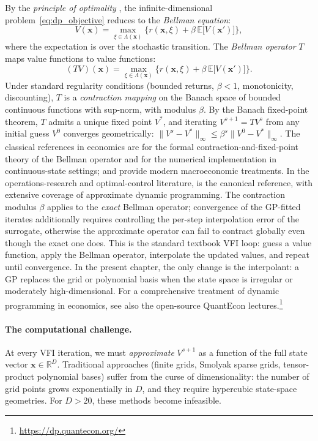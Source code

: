 \documentclass[11pt,a4paper]{report}
\newcommand{\x}{\bm{x}}
\newcommand{\R}{\mathbb{R}}
\begin{document}
By the \emph{principle of optimality} \citep{bellman1957}, the infinite-dimensional problem~\eqref{eq:dp_objective} reduces to the \emph{Bellman equation}:
\begin{equation}
V(\x) = \max_{\xi \in \Lambda(\x)} \bigl\{ r(\x, \xi) + \beta\, \mathbb{E}\bigl[V(\x')\bigr] \bigr\},
\label{eq:bellman}
\end{equation}
where the expectation is over the stochastic transition.  The \emph{Bellman operator} $T$ maps value functions to value functions:
\[
(TV)(\x) = \max_{\xi \in \Lambda(\x)} \bigl\{ r(\x, \xi) + \beta\, \mathbb{E}\bigl[V(\x')\bigr] \bigr\}.
\]
Under standard regularity conditions (bounded returns, $\beta < 1$, monotonicity, discounting), $T$ is a \emph{contraction mapping} on the Banach space of bounded continuous functions with sup-norm, with modulus $\beta$.  By the Banach fixed-point theorem, $T$ admits a unique fixed point $V^*$, and iterating $V^{s+1} = TV^s$ from any initial guess $V^0$ converges geometrically: $\|V^s - V^*\|_\infty \le \beta^s \|V^0 - V^*\|_\infty$.  The classical references in economics are \citet[Chs.~3--4]{stokeylucas1989} for the formal contraction-and-fixed-point theory of the Bellman operator and \citet[][Ch.~12]{judd1998numerical} for the numerical implementation in continuous-state settings; \citet[Chs.~3--4]{ljungqvist2018recursive} and \citet{sargentstachurski2026dp} provide modern macroeconomic treatments.  In the operations-research and optimal-control literature, \citet{Bertsekas:2000:DPO:517430} is the canonical reference, with extensive coverage of approximate dynamic programming.  The contraction modulus $\beta$ applies to the \emph{exact} Bellman operator; convergence of the GP-fitted iterates additionally requires controlling the per-step interpolation error of the surrogate, otherwise the approximate operator can fail to contract globally even though the exact one does.  This is the standard textbook VFI loop: guess a value function, apply the Bellman operator, interpolate the updated values, and repeat until convergence.  In the present chapter, the only change is the interpolant: a GP replaces the grid or polynomial basis when the state space is irregular or moderately high-dimensional.  For a comprehensive treatment of dynamic programming in economics, see also the open-source QuantEcon lectures.\footnote{\url{https://dp.quantecon.org/}}

\paragraph{The computational challenge.}
At every VFI iteration, we must \emph{approximate} $V^{s+1}$ as a function of the full state vector $\x \in \R^D$.  Traditional approaches (finite grids, Smolyak sparse grids, tensor-product polynomial bases) suffer from the curse of dimensionality: the number of grid points grows exponentially in $D$, and they require hypercubic state-space geometries.  For $D > 20$, these methods become infeasible.
\end{document}
